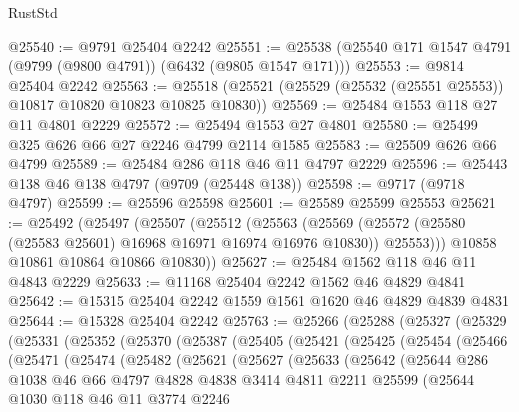 \begin{lexlean}{RustStd}
\begin{coremodule}
@25540 := @9791 @25404 @2242
@25551 := @25538 (@25540 @171 @1547 @4791 (@9799 (@9800 @4791)) (@6432 (@9805 @1547 @171)))
@25553 := @9814 @25404 @2242
@25563 := @25518 (@25521 (@25529 (@25532 (@25551 @25553)) @10817 @10820 @10823 @10825 @10830))
@25569 := @25484 @1553 @118 @27 @11 @4801 @2229
@25572 := @25494 @1553 @27 @4801
@25580 := @25499 @325 @626 @66 @27 @2246 @4799 @2114 @1585
@25583 := @25509 @626 @66 @4799
@25589 := @25484 @286 @118 @46 @11 @4797 @2229
@25596 := @25443 @138 @46 @138 @4797 (@9709 (@25448 @138))
@25598 := @9717 (@9718 @4797)
@25599 := @25596 @25598
@25601 := @25589 @25599 @25553
@25621 := @25492
    (@25497
      (@25507
        (@25512
          (@25563
            (@25569 (@25572 (@25580 (@25583 @25601) @16968 @16971 @16974 @16976 @10830)) @25553)))
        @10858
        @10861
        @10864
        @10866
        @10830))
@25627 := @25484 @1562 @118 @46 @11 @4843 @2229
@25633 := @11168 @25404 @2242 @1562 @46 @4829 @4841
@25642 := @15315 @25404 @2242 @1559 @1561 @1620 @46 @4829 @4839 @4831
@25644 := @15328 @25404 @2242
@25763 := @25266
    (@25288
      (@25327
        (@25329
          (@25331
            (@25352
              (@25370
                (@25387
                  (@25405
                    (@25421
                      (@25425
                        (@25454
                          (@25466
                            (@25471
                              (@25474
                                (@25482
                                  (@25621
                                    (@25627
                                      (@25633
                                        (@25642
                                          (@25644
                                            @286
                                            @1038
                                            @46
                                            @66
                                            @4797
                                            @4828
                                            @4838
                                            @3414
                                            @4811
                                            @2211
                                            @25599
                                            (@25644
                                              @1030
                                              @118
                                              @46
                                              @11
                                              @3774
                                              @2246

\end{coremodule}
\end{lexlean}
